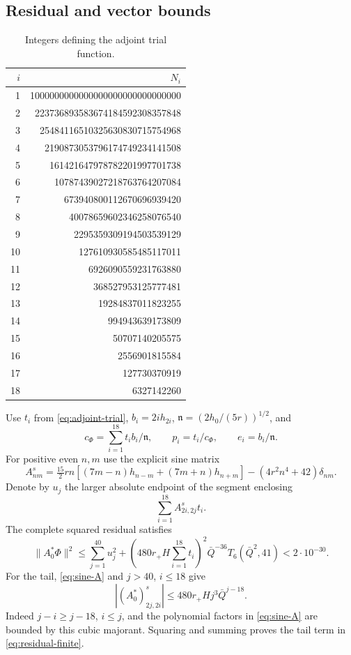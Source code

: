 \documentclass[a4paper,11pt]{article}
\numberwithin{equation}{section}
\theoremstyle{definition}
\theoremstyle{remark}
\newcommand{\norm}[1]{\lVert#1\rVert}
\begin{document}
\subsection{Residual and vector bounds}
\begin{table}[htbp]
\centering\small
\caption{Integers defining the adjoint trial function.}\label{tab:adjoint-trial}
\begin{tabular}{rr}
\toprule $i$ & $N_i$\\\midrule
1 & 1000000000000000000000000000000\\
2 & 223736893583674184592308357848\\
3 & 25484116510325630830715754968\\
4 & 2190873053796174749234141508\\
5 & 161421647978782201997701738\\
6 & 10787439027218763764207084\\
7 & 673940800112670696939420\\
8 & 40078659602346258076540\\
9 & 2295359309194503539129\\
10 & 127610930585485117011\\
11 & 6926090559231763880\\
12 & 368527953125777481\\
13 & 19284837011823255\\
14 & 994943639173809\\
15 & 50707140205575\\
16 & 2556901815584\\
17 & 127730370919\\
18 & 6327142260\\
\bottomrule
\end{tabular}
\end{table}

Use $t_i$ from \eqref{eq:adjoint-trial}, $b_i=2ih_{2i}$, $\mathfrak n=(2h_0/(5r))^{1/2}$, and
\[
 c_\Phi=\sum_{i=1}^{18}t_i b_i/\mathfrak n,\qquad
 p_i=t_i/c_\Phi,\qquad e_i=b_i/\mathfrak n.
\]
For positive even $n,m$ use the explicit sine matrix
\begin{equation}\label{eq:sine-A}
 A^s_{nm}=\tfrac{15}{2}rn\left[(7m-n)h_{n-m}+(7m+n)h_{n+m}\right]
 -(4r^2n^4+42)\delta_{nm}.
\end{equation}
Denote by $u_j$ the larger absolute endpoint of the segment enclosing
\[
 \sum_{i=1}^{18}A^s_{2i,2j}t_i.
\]
The complete squared residual satisfies
\begin{equation}\label{eq:residual-finite}
 \norm{A_0^*\Phi}^2\le\sum_{j=1}^{40}u_j^2+
 \left(480r_+H\sum_{i=1}^{18}t_i\right)^2
 \bar Q^{-36}T_6(\bar Q^2,41)<2\cdot10^{-30}.
\end{equation}
For the tail, \eqref{eq:sine-A} and $j>40$, $i\le18$ give
\[
 |(A_0^*)^s_{2j,2i}|\le480r_+Hj^3\bar Q^{j-18}.
\]
Indeed $j-i\ge j-18$, $i\le j$, and the polynomial factors in \eqref{eq:sine-A} are bounded by this cubic majorant. Squaring and summing proves the tail term in \eqref{eq:residual-finite}.
\end{document}
